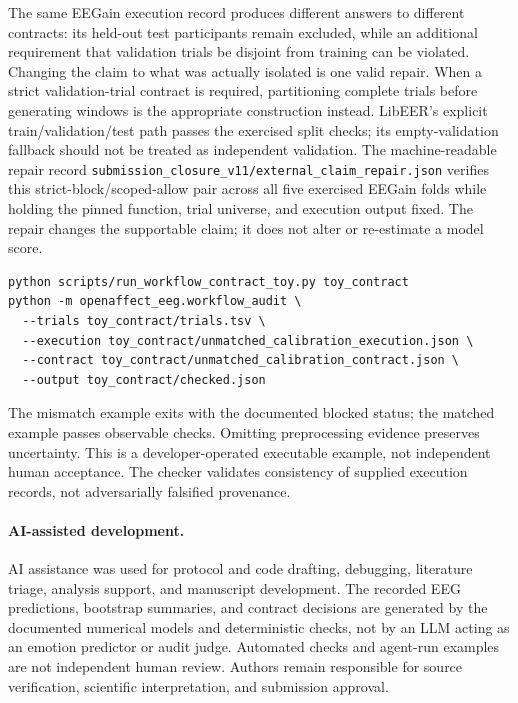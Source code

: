The same EEGain execution record produces different answers to different
contracts: its held-out test participants remain excluded, while an additional
requirement that validation trials be disjoint from training can be violated.
Changing the claim to what was actually isolated is one valid repair. When a
strict validation-trial contract is required, partitioning complete trials
before generating windows is the appropriate construction instead. LibEER's
explicit train/validation/test path passes the exercised split checks; its
empty-validation fallback should not be treated as independent validation.
The machine-readable repair record
\texttt{submission\_closure\_v11/external\_claim\_repair.json} verifies this
strict-block/scoped-allow pair across all five exercised EEGain folds while
holding the pinned function, trial universe, and execution output fixed. The
repair changes the supportable claim; it does not alter or re-estimate a model
score.

\begin{small}\begin{verbatim}
python scripts/run_workflow_contract_toy.py toy_contract
python -m openaffect_eeg.workflow_audit \
  --trials toy_contract/trials.tsv \
  --execution toy_contract/unmatched_calibration_execution.json \
  --contract toy_contract/unmatched_calibration_contract.json \
  --output toy_contract/checked.json
\end{verbatim}\end{small}
The mismatch example exits with the documented blocked status; the matched
example passes observable checks. Omitting preprocessing evidence preserves
uncertainty. This is a developer-operated executable example, not independent
human acceptance. The checker validates consistency of supplied execution
records, not adversarially falsified provenance.

\paragraph{AI-assisted development.}
AI assistance was used for protocol and code drafting, debugging, literature
triage, analysis support, and manuscript development. The recorded EEG
predictions, bootstrap summaries, and contract decisions are generated by
the documented numerical models and deterministic checks, not by an LLM
acting as an emotion predictor or audit judge. Automated checks and agent-run
examples are not independent human review. Authors remain responsible for
source verification, scientific interpretation, and submission approval.

